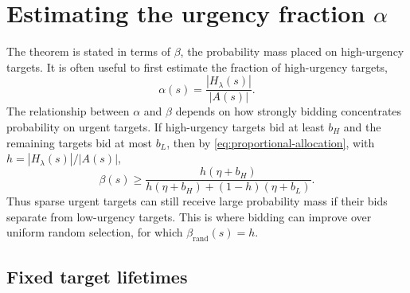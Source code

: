 \documentclass[11pt]{article}
\begin{document}
\section{Estimating the urgency fraction $\alpha$}

The theorem is stated in terms of $\beta$, the probability mass placed on high-urgency targets. It is often useful to
first estimate the fraction of high-urgency targets,
\begin{equation}
  \alpha(s)=\frac{|H_\lambda(s)|}{|A(s)|}.
  \label{eq:alpha-state}
\end{equation}
The relationship between $\alpha$ and $\beta$ depends on how strongly bidding concentrates probability on urgent
targets. If high-urgency targets bid at least $b_H$ and the remaining targets bid at most $b_L$, then by
\eqref{eq:proportional-allocation}, with $h=|H_\lambda(s)|/|A(s)|$,
\begin{equation}
  \beta(s)
  \ge
  \frac{h(\eta+b_H)}{h(\eta+b_H)+(1-h)(\eta+b_L)}.
  \label{eq:beta-from-alpha}
\end{equation}
Thus sparse urgent targets can still receive large probability mass if their bids separate from low-urgency targets.
This is where bidding can improve over uniform random selection, for which $\beta_{\mathrm{rand}}(s)=h$.

\subsection{Fixed target lifetimes}
\end{document}
